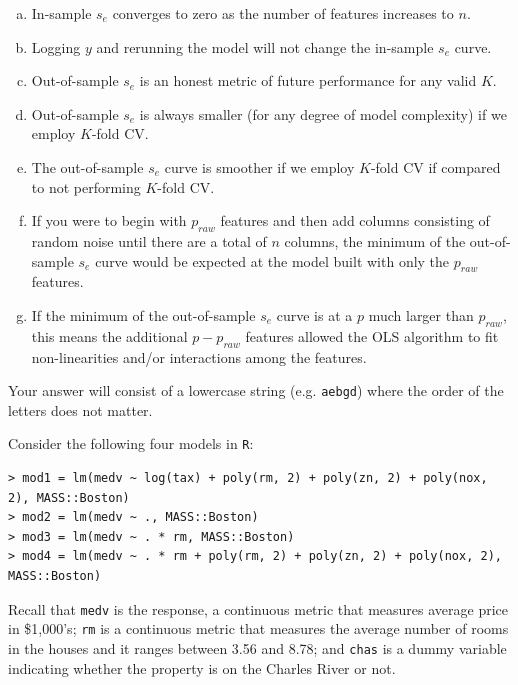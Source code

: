 \documentclass[12pt,landscape]{article}
\newcommand{\instr}{\small Your answer will consist of a lowercase string (e.g. \texttt{aebgd}) where the order of the letters does not matter. \normalsize}
\begin{document}
\begin{enumerate}[(a)]
\item In-sample $s_e$ converges to zero as the number of features increases to $n$.
\item Logging $y$ and rerunning the model will not change the in-sample $s_e$ curve.
\item Out-of-sample $s_e$ is an honest metric of future performance for any valid $K$.
\item Out-of-sample $s_e$ is always smaller (for any degree of model complexity) if we employ $K$-fold CV.
\item The out-of-sample $s_e$ curve is smoother if we employ $K$-fold CV if compared to not performing $K$-fold CV.
\item If you were to begin with $p_{raw}$ features and then add columns consisting of random noise until there are a total of $n$ columns, the minimum of the out-of-sample $s_e$ curve would be expected at the model built with only the $p_{raw}$ features.
\item If the minimum of the out-of-sample $s_e$ curve is at a $p$ much larger than $p_{raw}$, this means the additional $p - p_{raw}$ features allowed the OLS algorithm to fit non-linearities and/or interactions among the features.
\end{enumerate}
\eenum\instr\pagebreak


\problem{} Consider the following four models in \texttt{R}:

\begin{lstlisting}[basicstyle=\normalsize]
> mod1 = lm(medv ~ log(tax) + poly(rm, 2) + poly(zn, 2) + poly(nox, 2), MASS::Boston)
> mod2 = lm(medv ~ ., MASS::Boston)
> mod3 = lm(medv ~ . * rm, MASS::Boston)
> mod4 = lm(medv ~ . * rm + poly(rm, 2) + poly(zn, 2) + poly(nox, 2), MASS::Boston)
\end{lstlisting}
\vspace{-0.75cm}

\noindent Recall that \texttt{medv} is the response, a continuous metric that measures average price in \$1,000's; \texttt{rm} is a continuous metric that measures the average number of rooms in the houses and it ranges between 3.56 and 8.78; and \texttt{chas} is a dummy variable indicating whether the property is on the Charles River or not.
\benum{}
\end{document}
